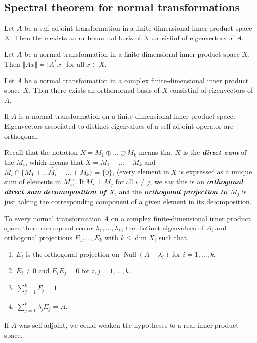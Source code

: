 \documentclass{article}
\theoremstyle{definition}
\begin{document}
	\subsection{Spectral theorem for normal transformations}
	\begin{thm}
		Let $A$ be a self-adjoint transformation in a finite-dimensional inner product space $X$. Then there exists an orthonormal basis of $X$ consistinf of eigenvectors of $A$.
	\end{thm}
	\begin{lemma}
		Let $A$ be a normal transformation in a finite-dimensional inner product space $X$. Then $\Vert Ax\Vert=\Vert A^*x\Vert$ for all $x\in X$.
	\end{lemma}
	\begin{thm}
		Let $A$ be a normal transformation in a complex finite-dimensional inner product space $X$. Then there exists an orthonormal basis of $X$ consistinf of eigenvectors of $A$.
	\end{thm}
	\begin{thm}
		If $A$ is a normal transformation on a finite-dimensional inner product space. Eigenvectors associated to distinct eigenvalues of a self-adjoint operator are orthogonal.
	\end{thm}
	Recall that the notation $X=M_1\oplus\ldots\oplus M_k$ means that $X$ is the \textbf{\textit{direct sum}} of the $M_i$, which means that $X=M_1+\ldots+M_k$ and $M_i\cap\{M_1+\ldots \hat{M_i}+\ldots+M_k\}=\{0\}$, (every element in $X$ is expressed as a unique sum of elements in $M_i$). If $M_i\perp M_j$ for all $i\neq j$, we say this is an \textbf{\textit{orthogonal direct sum decomoposition of $X$}}, and the \textbf{\textit{orthogonal projection to $M_j$}} is just taking the corresponding component of a given element in its decomposition.
	\begin{thm}
		To every normal transformation $A$ on a complex finite-dimensional inner product space there correspond scalar $\lambda_1,\ldots,\lambda_k$, the distinct eigenvalues of $A$, and orthogonal projections $E_1,\ldots,E_k$ with $k\leq \dim X$, such that
		\begin{enumerate}
			\item $E_i$ is the orthogonal projection on $\operatorname{Null}(A-\lambda_i)$ for $i=1,\ldots,k$.
			\item $E_i\neq0$ and $E_iE_j=0$ for $i,j=1,\ldots,k$.
			\item $\sum_{j=1}^kE_j=1$.
			\item $\sum_{j=1}^k\lambda_jE_j=A$.
		\end{enumerate}
	\end{thm}
	If $A$ was self-adjoint, we could weaken the hypotheses to a real inner product space.
\end{document}
